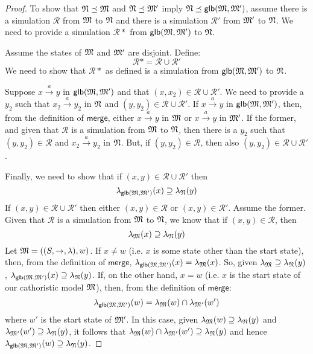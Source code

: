 \begin{proof}
To show that $\frak{N} \preceq \frak{M}$ and $\frak{N} \preceq \frak{M}'$ imply $\frak{N} \preceq \mathsf{glb}(\frak{M}, \frak{M}')$, assume there is a simulation $\mathcal{R}$ from $\frak{M}$ to $\frak{N}$ and there is a simulation $\mathcal{R}'$ from $\frak{M}'$ to $\frak{N}$.
We need to provide a simulation $\mathcal{R}*$ from $\mathsf{glb}(\frak{M}, \frak{M}')$ to $\frak{N}$.

Assume the states of $\frak{M}$ and $\frak{M}'$ are disjoint.
Define:
\[
\mathcal{R}* = \mathcal{R} \cup \mathcal{R}'
\]
We need to show that $\mathcal{R}*$ as defined is a simulation from $\mathsf{glb}(\frak{M}, \frak{M}')$ to $\frak{N}$.

Suppose $x \xrightarrow{a} y$ in $\mathsf{glb}(\frak{M}, \frak{M}')$ and that $(x,x_2) \in \mathcal{R} \cup \mathcal{R}'$.
We need to provide a $y_2$ such that $x_2 \xrightarrow{a} y_2$ in  $\frak{N}$ and $(y,y_2) \in \mathcal{R} \cup \mathcal{R}'$.
If  $x \xrightarrow{a} y$ in $\mathsf{glb}(\frak{M}, \frak{M}')$, then, from the definition of $\mathsf{merge}$, either $x \xrightarrow{a} y$ in $\frak{M}$ or $x \xrightarrow{a} y$ in $\frak{M}'$. If the former, and given that $\mathcal{R}$ is a simulation from $\frak{M}$ to $\frak{N}$, then there is a $y_2$ such that $(y,y_2) \in \mathcal{R}$ and $x_2 \xrightarrow{a} y_2$ in $\frak{N}$. But, if $(y,y_2) \in \mathcal{R}$, then also $(y,y_2) \in \mathcal{R} \cup \mathcal{R}'$.

Finally, we need to show that if $(x,y) \in \mathcal{R} \cup \mathcal{R}'$ then
\[
\lambda_{\mathsf{glb}(\frak{M}, \frak{M}')}(x) \supseteq \lambda_{\frak{N}}(y)
\]
If $(x,y) \in \mathcal{R} \cup \mathcal{R}'$ then either $(x,y) \in \mathcal{R}$ or $(x,y) \in \mathcal{R}'$.
Assume the former.
Given that $\mathcal{R}$ is a simulation from $\frak{M}$ to $\frak{N}$, we know that if $(x,y) \in \mathcal{R}$, then 
\[
\lambda_{\frak{M}}(x) \supseteq \lambda_{\frak{N}}(y)
\]
Let $\frak{M} = ((S,\rightarrow,\lambda),w)$.
If $x \neq w$ (i.e. $x$ is some state other than the start state), then, from the definition of $\mathsf{merge}$, $\lambda_{\mathsf{glb}(\frak{M}, \frak{M}')}(x) = \lambda_{\frak{M}}(x)$.
So, given $\lambda_{\frak{M}} \supseteq \lambda_{\frak{N}}(y)$, $\lambda_{\mathsf{glb}(\frak{M}, \frak{M}')}(x) \supseteq \lambda_{\frak{N}}(y)$.
If, on the other hand, $x = w$ (i.e. $x$ is the start state  of our cathoristic model $\frak{M}$), then, from the definition of $\mathsf{merge}$:
\[
\lambda_{\mathsf{glb}(\frak{M}, \frak{M}')}(w) = \lambda_{\frak{M}}(w) \cap \lambda_{\frak{M}'}(w')
\]
where $w'$ is the start state  of $\frak{M}'$.
In this case, given $\lambda_{\frak{M}}(w) \supseteq \lambda_{\frak{N}}(y)$ and $\lambda_{\frak{M}'}(w') \supseteq \lambda_{\frak{N}}(y)$, it follows that $\lambda_{\frak{M}}(w) \cap \lambda_{\frak{M}'}(w') \supseteq \lambda_{\frak{N}}(y)$ and hence $\lambda_{\mathsf{glb}(\frak{M}, \frak{M}')}(w) \supseteq \lambda_{\frak{N}}(y)$.

\end{proof}

